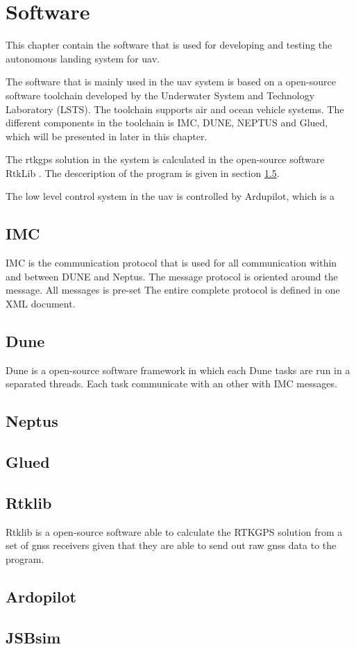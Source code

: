 \chapter{Software}
This chapter contain the software that is used for developing and testing the autonomous landing system for uav. 

The software that is mainly used in the uav system is based on a open-source software toolchain developed by the Underwater System and Technology Laboratory (LSTS). The toolchain supports air and ocean vehicle systems. The different components in the toolchain is IMC, DUNE, NEPTUS and Glued, which will be presented in later in this chapter. 

The rtkgps solution in the system is calculated in the open-source software RtkLib \citep{takasu2009development}. The desceription of the program is given in section \ref{s:Rtklib}.

The low level control system in the uav is controlled by Ardupilot, which is a 
\section{IMC}
IMC \citep{martins2009imc} is the communication protocol that is used for all communication within and between DUNE and Neptus. The message protocol is oriented around the message. All messages is pre-set  The entire complete protocol is defined in one XML document. 
\section{Dune}
Dune is a open-source software framework in which each Dune tasks are run in a separated threads. Each task communicate with an other with IMC messages. 
\section{Neptus}
\section{Glued}
\section{Rtklib}\label{s:Rtklib}
Rtklib is a open-source software able to calculate the RTKGPS solution from a set of gnss receivers given that they are able to send out raw gnss data to the program. 
\section{Ardopilot}
\section{JSBsim}